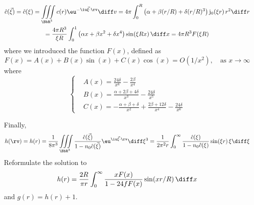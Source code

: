 \documentclass[12pt,a4paper]{article}
\newcommand{\numden}{n_{0}}
\begin{document}
\begin{multline*}
  \hat{c}(\vec{\xi})=\hat{c}(\xi)=\iiint\limits_{\BbR^3}c(r)\eu^{-\iu\vec{\xi}\cdot\rv}\diff v
  =4\pi\int_{0}^{R}\left(\alpha+\beta (r/R)+\delta(r/R)^3\right)\mathrm{j}_0(\xi r)\,r^2\diff r\\
  =\frac{4\pi R^3}{\xi R}\int_{0}^{1}\left(\alpha x+\beta x^2+\delta x^4\right)\sin(\xi Rx)\,\diff x
    =4\pi R^3F(\xi R)
\end{multline*}
where we introduced the function $F(x)$, defined as
\begin{equation}\label{eq:P-Y 1}
F(x)=A(x)+B(x)\sin(x)+C(x)\cos(x)=O(1/x^2),\quad\text{as }x\to\infty
\end{equation}
where
\begin{equation*}
  \left\{\begin{aligned}
           &A(x)=\frac{24\delta}{x^6}-\frac{2\beta}{x^4}\\
           &B(x)=\frac{\alpha+2\beta+4\delta}{x^3}-\frac{24\delta}{x^5}\\
           &C(x)=-\frac{\alpha+\beta+\delta}{x^2}+\frac{2\beta+12\delta}{x^4}-\frac{24\delta}{x^6}
         \end{aligned}\right.
\end{equation*}

Finally,
\begin{equation*}
  h(\rv)=h(r)=\frac{1}{8\pi^3}\iiint\limits_{\BbR^3}\frac{\hat{c}(\vec{\xi})}{1-\numden\hat{c}(\vec{\xi})}\eu^{\iu\vec{\xi}\cdot\rv}\diff \xi^3
  =\frac{1}{2\pi^2 r}\int_{0}^{\infty}\frac{\hat{c}(\xi)}{1-\numden\hat{c}(\xi)}\sin(\xi r)\,\xi\diff\xi
\end{equation*}
Reformulate the solution to
\begin{equation*}
 h(r)=\frac{2R}{\pi r}\int_{0}^{\infty}\frac{xF(x)}{1-24fF(x)}\sin(xr/R)\,\diff x
\end{equation*}
and $g(r)=h(r)+1$.
\end{document}
